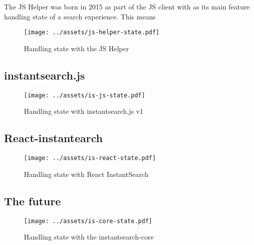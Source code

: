 The JS Helper was born in 2015 as part of the JS client\cite{algolia-blog-js-client} with as its main feature handling state of a search experience. This means

\begin{figure}[H]
  \label{figure:company-logo}
  \centering
  \texttt{[image: ../assets/js-helper-state.pdf]}
  \caption{Handling state with the JS Helper}
\end{figure}


\subsection{instantsearch.js} %
\label{sub:instantsearch_js}

\begin{figure}[H]
  \label{figure:company-logo}
  \centering
  \texttt{[image: ../assets/is-js-state.pdf]}
  \caption{Handling state with instantsearch.js v1}
\end{figure}


\subsection{React-instantearch} %
\label{sub:react_instantearch}

\begin{figure}[H]
  \label{figure:company-logo}
  \centering
  \texttt{[image: ../assets/is-react-state.pdf]}
  \caption{Handling state with React InstantSearch}
\end{figure}


\subsection{The future} %
\label{sub:the_future}

\begin{figure}[H]
  \label{figure:company-logo}
  \centering
  \texttt{[image: ../assets/is-core-state.pdf]}
  \caption{Handling state with the instantsearch-core}
\end{figure}


